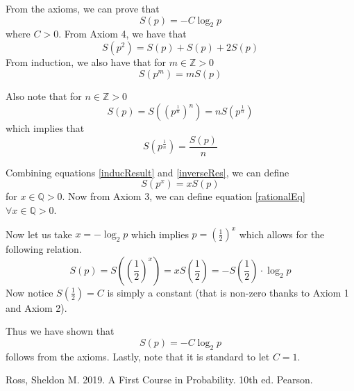 \documentclass{article}
\begin{document}
\bigskip

From the axioms, we can prove that
\[
S(p) = -C\log_2 p
\]
where $C > 0$.
From Axiom 4, we have that 
\[
S(p^2)=S(p)+S(p)+2S(p)
\]
From induction, we also have that for $m\in \mathbb{Z} > 0$
\begin{equation} \label{inducResult}
    S(p^m)=mS(p)
\end{equation}

Also note that for $n\in \mathbb{Z} > 0$
\[
S(p) = S\left((p^\frac{1}{n})^n\right) = nS(p^\frac{1}{n})
\]
which implies that
\begin{equation} \label{inverseRes}
    S(p^\frac{1}{n}) = \frac{S(p)}{n}
\end{equation}

Combining equations \ref{inducResult} and \ref{inverseRes}, we can define
\begin{equation} \label{rationalEq}
    S(p^x)=xS(p)
\end{equation}
for $x \in \mathbb{Q} >0$. Now from Axiom 3, we can define equation \ref{rationalEq} $\forall x \in\mathbb{Q} >0$.

Now let us take $x=-\log_2 p$ which implies $p=\left(\frac{1}{2}\right)^x$ which allows for the following relation.
\[
S(p) = S\left((\frac{1}{2})^x\right) = xS\left(\frac{1}{2}\right) = -S\left(\frac{1}{2}\right)\cdot\log_2 p
\]
Now notice $S\left(\frac{1}{2}\right) = C$ is simply a constant (that is non-zero thanks to Axiom 1 and Axiom 2).

Thus we have shown that
\begin{equation}
    S(p) = -C\log_2 p
\end{equation}
follows from the axioms.
Lastly, note that it is standard to let $C=1$.

\newpage
\begin{thebibliography}{00}
 Ross, Sheldon M. 2019. A First Course in Probability. 10th ed. Pearson.
\end{thebibliography}
\end{document}
